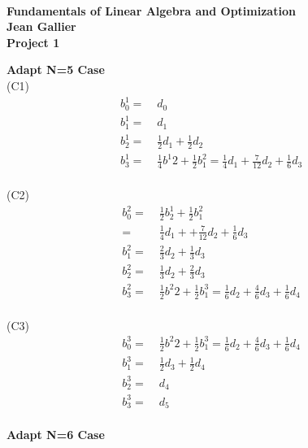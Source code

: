 \documentclass[12pt]{article}
\begin{document}
\begin{center}
\\
\vspace{1cm}
{\Large\bf Fundamentals of Linear Algebra and Optimization\\
Jean Gallier \\
\vspace{0.5cm}
Project 1}\\[10pt]
\end{center}

\vspace {0.25cm}\noindent
{\bf Adapt N=5 Case} \\

(C1)
\begin{align*}
b^{1}_{0} =&\; d_0 \\
b^{1}_{1} =&\; d_1 \\
b^{1}_{2} =&\; \frac{1}{2} d_1 + \frac{1}{2}d_2 \\
b^{1}_{3} =&\; \frac{1}{4} b^{1}{2} + \frac{1}{2} b^{2}_{1} =\frac{1}{4}d_1 +\frac{7}{12}d_2 + \frac{1}{6}d_3 \\
\end{align*}

(C2)
\begin{align*}
b^{2}_{0} =&\; \frac{1}{2} b^{1}_{2} + \frac{1}{2} b^{2}_{1}\\
=&\; \frac{1}{4} d_1 + +\frac{7}{12}d_2 + \frac{1}{6}d_3 \\
b^{2}_{1} =&\; \frac{2}{3} d_2 + \frac{1}{3}d_3 \\
b^{2}_{2} =&\; \frac{1}{3} d_2 + \frac{2}{3}d_3 \\
b^{2}_{3} =&\; \frac{1}{2} b^{2}{2} + \frac{1}{2} b^{3}_{1} =\frac{1}{6}d_2 +\frac{4}{6}d_3 + \frac{1}{6}d_4 \\
\end{align*}

(C3)
\begin{align*}
b^{3}_{0} =&\; \frac{1}{2} b^{2}{2} + \frac{1}{2} b^{3}_{1} =\frac{1}{6}d_2 +\frac{4}{6}d_3 + \frac{1}{6}d_4 \\
b^{3}_{1} =&\; \frac{1}{2}d_3 + \frac{1}{2} d_4 \\
b^{3}_{2} =&\; d_4 \\
b^{3}_{3} =&\; d_5 \\
\end{align*}

\vspace {0.25cm}\noindent
{\bf Adapt N=6 Case} \\
\end{document}
